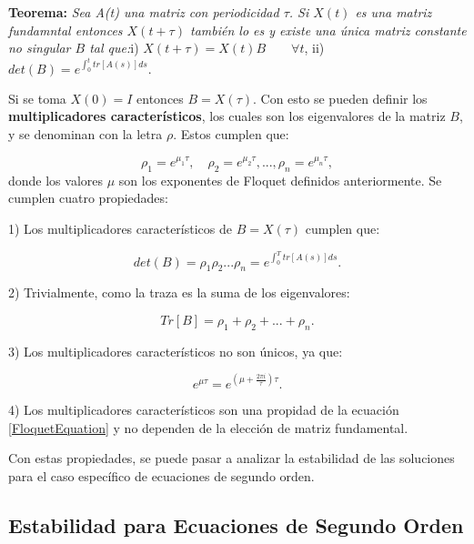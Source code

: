 \documentclass[a4paper,10pt]{report}
\begin{document}
\begin{center}
\textbf{Teorema:} \textit{Sea A(t) una matriz con periodicidad $\tau$. Si $X(t)$ es una matriz fundamntal entonces $X(t+\tau)$ también lo es y existe una única matriz constante no singular $B$ tal que:}\linebreak \linebreak i) $X(t+\tau) = X(t)B \qquad\forall t$, \linebreak ii) $det(B) = e^{\int_0^t tr[A(s)]ds}.$
\end{center}Si se toma $X(0)=I$ entonces $B=X(\tau)$. Con esto se pueden definir los \textbf{multiplicadores característicos}, los cuales son los eigenvalores de la matriz $B$, y se denominan con la letra $\rho$. Estos cumplen que:

\begin{equation}
\rho_1 = e^{\mu_1 \tau}, \quad \rho_2 = e^{\mu_2 \tau}, ... , \rho_n = e^{\mu_n \tau},
\end{equation} donde los valores $\mu$ son los exponentes de Floquet definidos anteriormente. Se cumplen cuatro propiedades:

1) Los multiplicadores característicos de $B=X(\tau)$ cumplen que:

\begin{equation}
det(B) = \rho_1 \rho_2 ... \rho_n = e^{\int_0^T tr[A(s)]ds}.
\end{equation}

2) Trivialmente, como la traza es la suma de los eigenvalores:

\begin{equation}
Tr[B] = \rho_1 + \rho_2 + ... + \rho_n.
\end{equation}

3) Los multiplicadores característicos no son únicos, ya que:

\begin{equation}
e^{\mu \tau} = e^{(\mu  +\frac{2\pi i}{\tau} )\tau}.
\end{equation}

4) Los multiplicadores característicos son una propidad de la ecuación \ref{FloquetEquation} y no dependen de la elección de matriz fundamental.

Con estas propiedades, se puede pasar a analizar la estabilidad de las soluciones para el caso específico de ecuaciones de segundo orden.

\subsection{Estabilidad para Ecuaciones de Segundo Orden}
\end{document}
